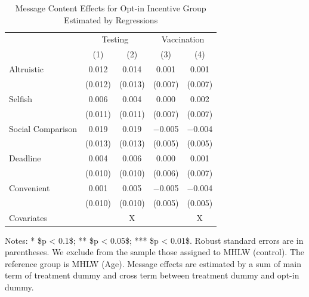 \documentclass[
]{article}
\begin{document}
\begin{table}

\caption{\label{tab:lh-act-woA}Message Content Effects for Opt-in Incentive Group Estimated by Regressions}
\centering
\fontsize{9}{11}\selectfont
\begin{threeparttable}
\begin{tabular}[t]{lcccc}
\toprule
\multicolumn{1}{c}{ } & \multicolumn{2}{c}{Testing} & \multicolumn{2}{c}{Vaccination} \\
\cmidrule(l{3pt}r{3pt}){2-3} \cmidrule(l{3pt}r{3pt}){4-5}
  & (1) & (2) & (3) & (4)\\
\midrule
Altruistic & \num{0.012} & \num{0.014} & \num{0.001} & \num{0.001}\\
 & (\num{0.012}) & (\num{0.013}) & (\num{0.007}) & (\num{0.007})\\
Selfish & \num{0.006} & \num{0.004} & \num{0.000} & \num{0.002}\\
 & (\num{0.011}) & (\num{0.011}) & (\num{0.007}) & (\num{0.007})\\
Social Comparison & \num{0.019} & \num{0.019} & \num{-0.005} & \num{-0.004}\\
 & (\num{0.013}) & (\num{0.013}) & (\num{0.005}) & (\num{0.005})\\
Deadline & \num{0.004} & \num{0.006} & \num{0.000} & \num{0.001}\\
 & (\num{0.010}) & (\num{0.010}) & (\num{0.006}) & (\num{0.007})\\
Convenient & \num{0.001} & \num{0.005} & \num{-0.005} & \num{-0.004}\\
 & (\num{0.010}) & (\num{0.010}) & (\num{0.005}) & (\num{0.005})\\
Covariates &  & X &  & X\\
\bottomrule
\end{tabular}
\begin{tablenotes}
\item Notes: * \$p < 0.1\$; ** \$p < 0.05\$; *** \$p < 0.01\$. Robust standard errors are in parentheses. We exclude from the sample those assigned to MHLW (control). The reference group is MHLW (Age). Message effects are estimated by a sum of main term of treatment dummy and cross term between treatment dummy and opt-in dummy.
\end{tablenotes}
\end{threeparttable}
\end{table}
\end{document}
